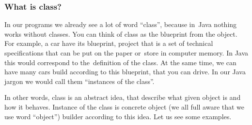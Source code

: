 \documentclass[10pt,t]{beamer}
\begin{document}
\begin{frame}
  \frametitle{What is class?}


  In our programs we already see a lot of word ``class'', because in~Java
  nothing works without classes. You can think of class as the blueprint
  from the object. For example, a car have its blueprint, project that
  is a set of technical specifications that can be put on the paper
  or~store in computer memory. In Java this would correspond to
  the~definition of the class. At the same time, we can have many cars
  build according to this blueprint, that you can drive. In our Java
  jargon we would call them ``instances of the class''.

  In other words, class is an abstract idea, that describe what given object
  is and how it behaves. Instance of the class is concrete object (we all
  full aware that we use word ``object'') builder according to this idea.
  Let us see some examples.

\end{frame}



































\end{document}
